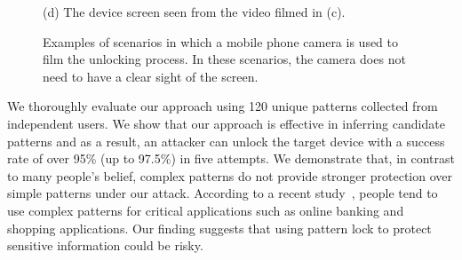 \begin{figure}[!h]
{\begin{minipage}[t]{3.5cm}
             \footnotesize (d) The device screen seen from the video filmed in (c).
            \end{minipage}
        }
        \hspace{0.5cm}
        \vspace{-2mm}
        \caption{Examples of scenarios in which a mobile phone camera is used to film the unlocking process.
        In these scenarios, the camera does not need to have a clear sight of the screen.}
        \label{fig:fig1}
        \vspace{-5mm}
    \end{figure}


We thoroughly evaluate our approach using 120 unique patterns collected from independent users. We show that our approach is effective in inferring candidate patterns and as a result, an attacker can unlock
the target device with a success rate of over 95\% (up to 97.5\%) in five attempts.
We demonstrate that, in contrast to many people's belief, complex patterns do not provide stronger protection over simple patterns under our attack. According to a recent study~\cite{alpnorway}, people tend to use complex
patterns for critical applications such as online banking and shopping applications. 
Our finding suggests that using pattern lock to protect sensitive information could be risky.

